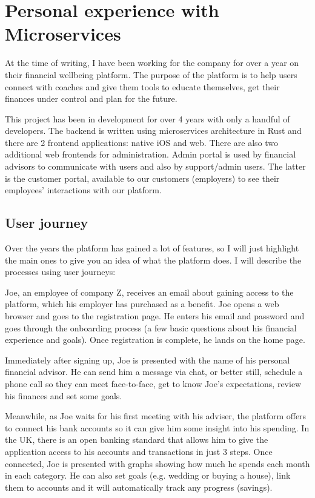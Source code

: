 \section{Personal experience with Microservices}
At the time of writing, I have been working for the company for over a year on their financial wellbeing platform. The purpose of the platform is to help users connect with coaches and give them tools to educate themselves, get their finances under control and plan for the future.

This project has been in development for over 4 years with only a handful of developers. The backend is written using microservices architecture in Rust and there are 2 frontend applications: native iOS and web. There are also two additional web frontends for administration. Admin portal is used by financial advisors to communicate with users and also by support/admin users. The latter is the customer portal, available to our customers (employers) to see their employees' interactions with our platform.

\subsection{User journey}
Over the years the platform has gained a lot of features, so I will just highlight the main ones to give you an idea of what the platform does. I will describe the processes using user journeys:

\begin{example}[Sign Up]
    Joe, an employee of company Z, receives an email about gaining access to the platform, which his employer has purchased as a benefit. Joe opens a web browser and goes to the registration page. He enters his email and password and goes through the onboarding process (a few basic questions about his financial experience and goals). Once registration is complete, he lands on the home page.
\end{example}

\begin{example}[Advisor]
    Immediately after signing up, Joe is presented with the name of his personal financial advisor. He can send him a message via chat, or better still, schedule a phone call so they can meet face-to-face, get to know Joe's expectations, review his finances and set some goals.
\end{example}

\begin{example}[Analyse]
    Meanwhile, as Joe waits for his first meeting with his adviser, the platform offers to connect his bank accounts so it can give him some insight into his spending. In the UK, there is an open banking standard that allows him to give the application access to his accounts and transactions in just 3 steps. Once connected, Joe is presented with graphs showing how much he spends each month in each category. He can also set goals (e.g. wedding or buying a house), link them to accounts and it will automatically track any progress (savings).
\end{example}

